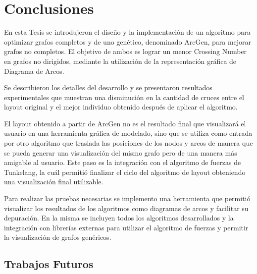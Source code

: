 \label{cap6}
\chapter{Conclusiones}
En esta Tesis se introdujeron el diseño y la implementación de un algoritmo para optimizar grafos completos y de uno genético, denominado {\sc ArcGen}, para mejorar grafos no completos. El objetivo de ambos es lograr un menor Crossing Number en grafos no dirigidos, mediante la utilización de la representación gráfica de Diagrama de Arcos.
	
Se describieron los detalles del desarrollo y se presentaron resultados experimentales que muestran una disminución en la cantidad de cruces entre el layout original y el mejor individuo obtenido después de aplicar el algoritmo.


El layout obtenido  a partir de {\sc ArcGen} no es el resultado final que visualizará el usuario en una herramienta gráfica de modelado, sino que se utiliza como entrada por otro algoritmo que traslada las posiciones de los nodos y arcos de manera que se pueda generar una visualización del mismo grafo pero de una manera más amigable al usuario. Este paso es la integración con el algoritmo de fuerzas de Tunkelang, la cuál permitió finalizar el ciclo del algoritmo de layout obteniendo una visualización final utilizable.

Para realizar las pruebas necesarias se implemento una herramienta que permitió visualizar los resultados de los algoritmos como diagramas de arcos y facilitar su depuración. En la misma se incluyen todos los algoritmos desarrollados y la integración con librerías externas para utilizar el algoritmo de fuerzas y permitir la visualización de grafos genéricos.


 \section{Trabajos Futuros}


